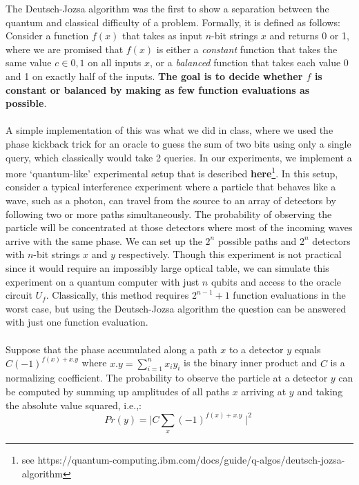 \documentclass[12pt]{article}
\begin{document}
    The Deutsch-Jozsa algorithm was the first to show a separation between the quantum and classical difficulty of a problem. Formally, it is defined as follows: Consider a function $f(x)$ that takes as input $n$-bit strings $x$ and returns 0 or 1, where we are promised that $f(x)$ is either a \emph{constant} function that takes the same value $c \in {0,1}$ on all inputs $x$, or a \emph{balanced} function that takes each value 0 and 1 on exactly half of the inputs. \textbf{The goal is to decide whether $f$ is constant or balanced by making as few function evaluations as possible}. 
    \\
    \smallskip
    \\
    A simple implementation of this was what we did in class, where we used the phase kickback trick for an oracle to guess the sum of two bits using only a single query, which classically would take 2 queries. In our experiments, we implement a more `quantum-like' experimental setup that is described \textbf{here}\footnote{see https://quantum-computing.ibm.com/docs/guide/q-algos/deutsch-jozsa-algorithm}. In this setup, consider a typical interference experiment where a particle that behaves like a wave, such as a photon, can travel from the source to an array of detectors by following two or more paths simultaneously. The probability of observing the particle will be concentrated at those detectors where most of the incoming waves arrive with the same phase. We can set up the $2^n$ possible paths and $2^n$ detectors with $n$-bit strings $x$ and $y$ respectively. Though this experiment is not practical since it would require an impossibly large optical table, we can simulate this experiment on a quantum computer with just $n$ qubits and access to the oracle circuit $U_f$. Classically, this method requires $2^{n-1}+1$ function evaluations in the worst case, but using the Deutsch-Jozsa algorithm the question can be answered with just one function evaluation.
    \\
    \smallskip
    \\
    Suppose that the phase accumulated along a path $x$ to a detector $y$ equals $C(-1)^{f(x)+x.y}$ where $x.y = \sum_{i=1}^{n} x_{i}y_{i}$ is the binary inner product and $C$ is a normalizing coefficient. The probability to observe the particle at a detector $y$ can be computed by summing up amplitudes of all paths $x$ arriving at $y$ and taking the absolute value squared, i.e.,:
    \begin{equation}
        Pr(y) = \mid C\sum_{x}(-1)^{f(x)+x.y} \mid^{2}
    \end{equation}
    
\end{document}
